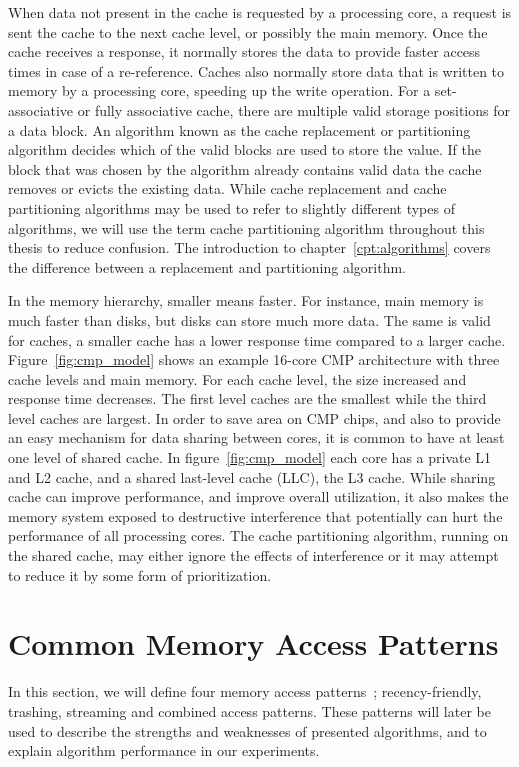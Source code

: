 When data not present in the cache is requested by a processing core, a request is sent the cache to the next cache level, or possibly the main memory.
Once the cache receives a response, it normally stores the data to provide faster access times in case of a re-reference.
Caches also normally store data that is written to memory by a processing core, speeding up the write operation.
For a set-associative or fully associative cache, there are multiple valid storage positions for a data block.
An algorithm known as the cache replacement or partitioning algorithm decides which of the valid blocks are used to store the value.
If the block that was chosen by the algorithm already contains valid data the cache removes or evicts the existing data.
While cache replacement and cache partitioning algorithms may be used to refer to slightly different types of algorithms, we will use the term cache partitioning algorithm throughout this thesis to reduce confusion.
The introduction to chapter~\ref{cpt:algorithms} covers the difference between a replacement and partitioning algorithm.

In the memory hierarchy, smaller means faster. 
For instance, main memory is much faster than disks, but disks can store much more data.
The same is valid for caches, a smaller cache has a lower response time compared to a larger cache.
Figure~\ref{fig:cmp_model} shows an example 16-core CMP architecture with three cache levels and main memory.
For each cache level, the size increased and response time decreases.
The first level caches are the smallest while the third level caches are largest.
In order to save area on CMP chips, and also to provide an easy mechanism for data sharing between cores, it is common to have at least one level of shared cache.
In figure~\ref{fig:cmp_model} each core has a private L1 and L2 cache, and a shared last-level cache (LLC), the L3 cache.
While sharing cache can improve performance, and improve overall utilization, it also makes the memory system exposed to destructive interference that potentially can hurt the performance of all processing cores. 
The cache partitioning algorithm, running on the shared cache, may either ignore the effects of interference or it may attempt to reduce it by some form of prioritization.

\section{Common Memory Access Patterns}

In this section, we will define four memory access patterns~\cite{Jaleel2010}; recency-friendly, trashing, streaming and combined access patterns.
These patterns will later be used to describe the strengths and weaknesses of presented algorithms, and to explain algorithm performance in our experiments.

